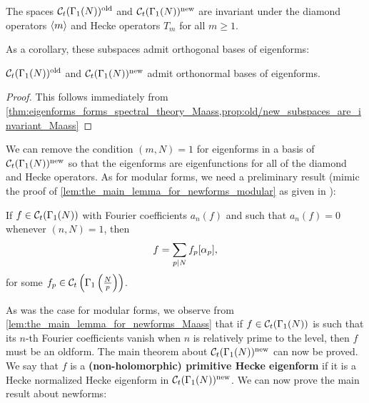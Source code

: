       \begin{proposition}\label{prop:old/new_subspaces_are_invariant_Maass}
        The spaces $\mathcal{C}_{t}(\Gamma_{1}(N))^{\mathrm{old}}$ and $\mathcal{C}_{t}(\Gamma_{1}(N))^{\mathrm{new}}$ are invariant under the diamond operators $\langle m\rangle$ and Hecke operators $T_{m}$ for all $m \ge 1$.
      \end{proposition}

      As a corollary, these subspaces admit orthogonal bases of eigenforms:

      \begin{corollary}\label{cor:old/new_eigenbasis_Maass}
        $\mathcal{C}_{t}(\Gamma_{1}(N))^{\mathrm{old}}$ and $\mathcal{C}_{t}(\Gamma_{1}(N))^{\mathrm{new}}$ admit orthonormal bases of eigenforms.
      \end{corollary}
      \begin{proof}
        This follows immediately from \cref{thm:eigenforms_forms_spectral_theory_Maass,prop:old/new_subspaces_are_invariant_Maass}
      \end{proof}

      We can remove the condition $(m,N) = 1$ for eigenforms in a basis of $\mathcal{C}_{t}(\Gamma_{1}(N))^{\mathrm{new}}$ so that the eigenforms are eigenfunctions for all of the diamond and Hecke operators. As for modular forms, we need a preliminary result (mimic the proof of \cref{lem:the_main_lemma_for_newforms_modular} as given in \cite{diamond2005first}):

      \begin{lemma}\label{lem:the_main_lemma_for_newforms_Maass}
        If $f \in \mathcal{C}_{t}(\Gamma_{1}(N))$ with Fourier coefficients $a_{n}(f)$ and such that $a_{n}(f) = 0$ whenever $(n,N) = 1$, then
        \[
          f = \sum_{p \mid N}f_{p}[\alpha_{p}],
        \]
        for some $f_{p} \in \mathcal{C}_{t}\left(\Gamma_{1}\left(\frac{N}{p}\right)\right)$.
      \end{lemma}

      As was the case for modular forms, we observe from \cref{lem:the_main_lemma_for_newforms_Maass} that if $f \in \mathcal{C}_{t}(\Gamma_{1}(N))$ is such that its $n$-th Fourier coefficients vanish when $n$ is relatively prime to the level, then $f$ must be an oldform. The main theorem about $\mathcal{C}_{t}(\Gamma_{1}(N))^{\mathrm{new}}$ can now be proved. We say that $f$ is a \textbf{(non-holomorphic) primitive Hecke eigenform} if it is a Hecke normalized Hecke eigenform in $\mathcal{C}_{t}(\Gamma_{1}(N))^{\mathrm{new}}$. We can now prove the main result about newforms:

